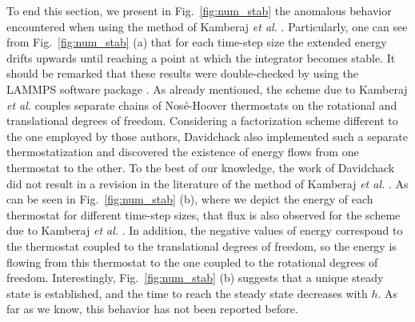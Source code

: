 \documentclass[
journal=jctcce,
layout=twocolumn
]{achemso}
\begin{document}
To end this section, we present in Fig.~\ref{fig:num_stab} the anomalous behavior encountered when using the method of Kamberaj \textit{et al.} \cite{Kamberaj_2005}.
Particularly, one can see from Fig.~\ref{fig:num_stab} (a) that for each time-step size the extended energy drifts upwards until reaching a point at which the integrator becomes stable.
It should be remarked that these results were double-checked by using the LAMMPS software package \cite{Plimpton_1995}. 
As already mentioned, the scheme due to Kamberaj \textit{et al.} \cite{Kamberaj_2005} couples separate chains of Nos\'{e}-Hoover thermostats on the rotational and translational degrees of freedom.
Considering a factorization scheme different to the one employed by those authors, Davidchack \cite{Davidchack_2009} also implemented such a separate thermostatization and discovered the existence of energy flows from one thermostat to the other.
To the best of our knowledge, the work of Davidchack \cite{Davidchack_2009} did not result in a revision in the literature of the method of Kamberaj \textit{et al.} \cite{Kamberaj_2005}.
As can be seen in Fig.~\ref{fig:num_stab} (b), where we depict the energy of each thermostat for different time-step sizes, that flux is also observed for the scheme due to Kamberaj \textit{et al.} \cite{Kamberaj_2005}.
In addition, the negative values of energy correspond to the thermostat coupled to the translational degrees of freedom, so the energy is flowing from this thermostat to the one coupled to the rotational degrees of freedom.
Interestingly, Fig.~\ref{fig:num_stab} (b) suggests that a unique steady state is established, and the time to reach the steady state decreases with $h$. As far as we know, this behavior has not been reported before.
\end{document}
